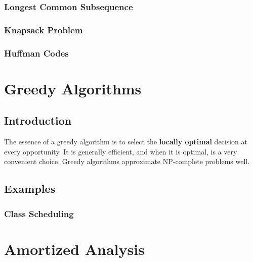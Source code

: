 \documentclass[a4paper,12pt]{report}
\begin{document}
\subsection{Longest Common Subsequence}



\subsection{Knapsack Problem}





\subsection{Huffman Codes}












\chapter{Greedy Algorithms}

\section{Introduction}

The essence of a greedy algorithm is to select the \textbf{locally optimal} decision at every opportunity. It is generally efficient, and when it is optimal, is a very convenient choice. Greedy algorithms approximate NP-complete problems well.

\section{Examples}

\subsection{Class Scheduling}








\chapter{Amortized Analysis}
\end{document}
